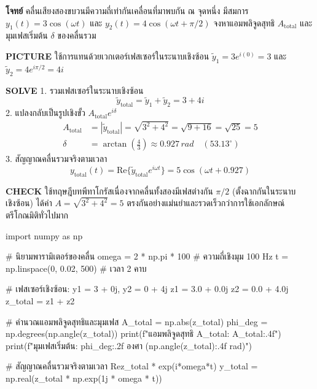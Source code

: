 \begin{mathexample}
\textbf{โจทย์} คลื่นเสียงสองขบวนมีความถี่เท่ากันเคลื่อนที่มาพบกัน ณ จุดหนึ่ง มีสมการ $y_1(t) = 3\cos(\omega t)$ และ $y_2(t) = 4\cos(\omega t + \pi/2)$ จงหาแอมพลิจูดสุทธิ $A_{\text{total}}$ และมุมเฟสเริ่มต้น $\delta$ ของคลื่นรวม

\vspace{0.2cm}
\textbf{PICTURE} ใช้การแทนด้วยเวกเตอร์เฟสเซอร์ในระนาบเชิงซ้อน $\tilde{y}_1 = 3 e^{i(0)} = 3$ และ $\tilde{y}_2 = 4 e^{i\pi/2} = 4i$

\vspace{0.2cm}
\textbf{SOLVE}
1. รวมเฟสเซอร์ในระนาบเชิงซ้อน
\begin{equation}
\tilde{y}_{\text{total}} = \tilde{y}_1 + \tilde{y}_2 = 3 + 4i
\end{equation}
2. แปลงกลับเป็นรูปเชิงขั้ว $A_{\text{total}} e^{i\delta}$
\begin{align}
A_{\text{total}} &= |\tilde{y}_{\text{total}}| = \sqrt{3^2 + 4^2} = \sqrt{9 + 16} = \sqrt{25} = 5 \\
\delta &= \arctan\left(\frac{4}{3}\right) \approx 0.927\,\si{rad} \quad (53.13^\circ)
\end{align}
3. สัญญาณคลื่นรวมจริงตามเวลา
\begin{equation}
y_{\text{total}}(t) = \text{Re}\{\tilde{y}_{\text{total}} e^{i\omega t}\} = 5\cos(\omega t + 0.927)
\end{equation}

\vspace{0.2cm}
\textbf{CHECK} ใช้ทฤษฎีบทพีทาโกรัสเนื่องจากคลื่นทั้งสองมีเฟสต่างกัน $\pi/2$ (ตั้งฉากกันในระนาบเชิงซ้อน) ได้ค่า $A = \sqrt{3^2 + 4^2} = 5$ ตรงกันอย่างแม่นยำและรวดเร็วกว่าการใช้เอกลักษณ์ตรีโกณมิติทั่วไปมาก\qedexam

\begin{pythonbox}
import numpy as np

# นิยามพารามิเตอร์ของคลื่น
omega = 2 * np.pi * 100  # ความถี่เชิงมุม 100 Hz
t = np.linspace(0, 0.02, 500)  # เวลา 2 คาบ

# เฟสเซอร์เชิงซ้อน: y1 = 3 + 0j, y2 = 0 + 4j
z1 = 3.0 + 0.0j
z2 = 0.0 + 4.0j
z_total = z1 + z2

# คำนวณแอมพลิจูดสุทธิและมุมเฟส
A_total = np.abs(z_total)
phi_deg = np.degrees(np.angle(z_total))
print(f"แอมพลิจูดสุทธิ A_total: {A_total:.4f}")
print(f"มุมเฟสเริ่มต้น: {phi_deg:.2f} องศา ({np.angle(z_total):.4f} rad)")

# สัญญาณคลื่นรวมจริงตามเวลา Re{z_total * exp(i*omega*t)}
y_total = np.real(z_total * np.exp(1j * omega * t))
\end{pythonbox}
\end{mathexample}

